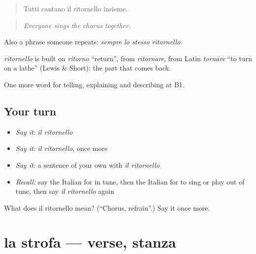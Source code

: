 \begin{quote}
Tutti cantano il ritornello insieme.
\end{quote}

\begin{quote}
\emph{Everyone sings the chorus together.}
\end{quote}

Also a phrase someone repeats: \emph{sempre lo stesso ritornello}.

\begin{cousinweb}
\emph{ritornello} is built on \emph{ritorno} \textquotedblleft{}return\textquotedblright{}, from \emph{ritornare}, from Latin \emph{tornāre} \textquotedblleft{}to turn on a lathe\textquotedblright{} (Lewis \& Short): the part that comes back.
\end{cousinweb}

\begin{grammarlens}[title={What you've built}]
One more word for telling, explaining and describing at B1.
\end{grammarlens}

\subsection*{Your turn}
\begin{itemize}
\raggedright
  \item \emph{Say it:} \emph{il ritornello}
  \item \emph{Say it:} \emph{il ritornello}, once more
  \item \emph{Say it:} a sentence of your own with \emph{il ritornello}
  \item \emph{Recall:} say the Italian for in tune, then the Italian for to sing or play out of tune, then say \emph{il ritornello} again
\end{itemize}

\begin{tcolorbox}[breakable,colback=teal!4,colframe=teal!35!black,title={Before you move on}]
What does il ritornello mean? (\textquotedblleft{}Chorus, refrain\textquotedblright{}.) Say it once more.
\end{tcolorbox}
\section[la strofa]{la strofa — verse, stanza}

\label{lesson:IT-C518-strofa}



